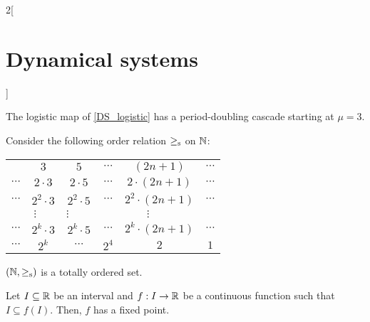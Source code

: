 \documentclass[../../../main_math.tex]{subfiles}
\begin{document}
\begin{multicols}{2}[\section{Dynamical systems}]
\begin{definition}
  \end{definition}
  \begin{theorem}
    The logistic map of \cref{DS_logistic} has a period-doubling cascade starting at $\mu = 3$.
  \end{theorem}
  \begin{definition}
    Consider the following order relation $\shark$ on $\mathbb{N}$:
    \begin{center}
      \def\arraystretch{1}
      \begin{tabular}{c@{ $\shark$ }c@{ $\shark$ }c@{ $\shark$ }c@{ $\shark$ }c@{ $\shark$ }c}
        \multicolumn{1}{c}{} & $3$                                   & $5$                                  & $\cdots$             & $(2n+1)$                             & $\cdots$             \\
        $\cdots$             & $2\cdot 3$                            & $2\cdot5$                            & $\cdots$             & $2\cdot(2n+1)$                       & $\cdots$             \\
        $\cdots$             & $2^2\cdot 3$                          & $2^2\cdot5$                          & $\cdots$             & $2^2\cdot(2n+1)$                     & $\cdots$             \\
        \multicolumn{1}{c}{} & \multicolumn{1}{c}{$\vdots\quad\ \ $} & \multicolumn{1}{c}{$\vdots\qquad\!$} & \multicolumn{1}{c}{} & \multicolumn{1}{c}{$\vdots\qquad\!$} & \multicolumn{1}{c}{} \\
        $\cdots$             & $2^k\cdot 3$                          & $2^k\cdot5$                          & $\cdots$             & $2^k\cdot(2n+1)$                     & $\cdots$             \\
        $\cdots$             & $2^k$                                 & $\cdots$                             & $2^4$                & $2$                                  & $1$                  \\
      \end{tabular}
    \end{center}
  \end{definition}
  \begin{lemma}
    $(\mathbb{N},\mathbin{\geq_{\mathrm{s}}})$ is a totally ordered set.
  \end{lemma}
  \begin{proposition}
    Let $I\subseteq\mathbb{R}$ be an interval and $f:I\rightarrow \mathbb{R}$ be a continuous function such that $I\subseteq f(I)$. Then, $f$ has a fixed point.

\end{proposition}
\end{multicols}
\end{document}

